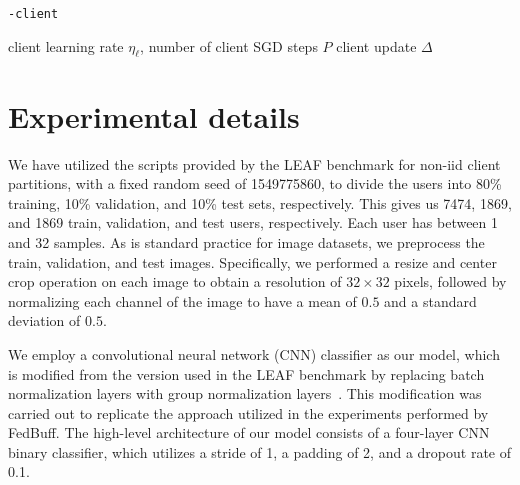 \begin{algorithm}[p]
    \caption{\texttt{\algname{}-client}} \label{alg:client}
    \begin{algorithmic}[1]
        \REQUIRE client learning rate $\eta_{\ell}$, number of client SGD steps $P$
        \ENDFOR
        \ENSURE client update $\Delta$
    \end{algorithmic}
\end{algorithm}

\begin{algorithm}[p]
    \caption{} \label{alg:client-background}
    \begin{algorithmic}[1]
        \REPEAT
    \end{algorithmic}
\end{algorithm}

\section{Experimental details}
\label{appsec:experimental-details}
We have utilized the scripts provided by the LEAF benchmark for non-iid client partitions, with a fixed random seed of 1549775860, to divide the users into 80\% training, 10\% validation, and 10\% test sets, respectively.
This gives us 7474, 1869, and 1869 train, validation, and test users, respectively.
Each user has between 1 and 32 samples.
As is standard practice for image datasets, we preprocess the train, validation, and test images.
Specifically, we performed a resize and center crop operation on each image to obtain a resolution of $32 \times 32$ pixels, followed by normalizing each channel of the image to have a mean of $0.5$ and a standard deviation of $0.5$.

We employ a convolutional neural network (CNN) classifier as our model, which is modified from the version used in the LEAF benchmark by replacing batch normalization layers with group normalization layers~\cite{groupnorm, batchnorm_with_groupnorm}.
This modification was carried out to replicate the approach utilized in the experiments performed by FedBuff.
The high-level architecture of our model consists of a four-layer CNN binary classifier, which utilizes a stride of 1, a padding of 2, and a dropout rate of 0.1.

